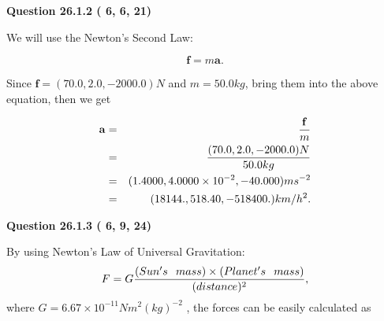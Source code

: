 \documentclass[12pt]{article}
\begin{document}
 
 
  
\vspace{0.2in}
  
{\textbf{\Large{Question
26.1.2 
 (          6,          6,         21)
}}}
  
  
 
 

We will use the Newton's Second Law:
 
\[
\mathbf{f}=m\mathbf{a}.
\]
 
Since $\mathbf{f}=( %
70.0,  %
2.0,  %
-2000.0 )N$
and $m= %
50.0 kg$, bring them into the above equation, then we get
 
\begin{eqnarray*}
\mathbf{a}&=&\frac{\mathbf{f}}m  \\
&=&\frac{(
70.0 ,
2.0 ,
-2000.0 )N
}{ %
50.0 kg}  \\
&=&(
1.4000 ,
4.0000 \times 10^{-2},
-40.000
)ms^{-2} \\
&=&(
18144. ,
518.40 ,
-518400.
)km/h^2.
\end{eqnarray*}
 
 
 
  
\vspace{0.2in}
  
{\textbf{\Large{Question
26.1.3 
 (          6,          9,         24)
}}}
  
  
 
 

By using Newton's Law of Universal Gravitation:
\[
F=G \frac{(Sun's \hspace{0.1in} mass) \times (Planet's \hspace{0.1in} mass)} { (distance)^2},
\]
where
$ G= %
6.67 \times 10^{-11}N m^{2}(kg)^{-2}$ , the forces can be easily calculated as
 
\vspace{0.2in}
 
\end{document}

